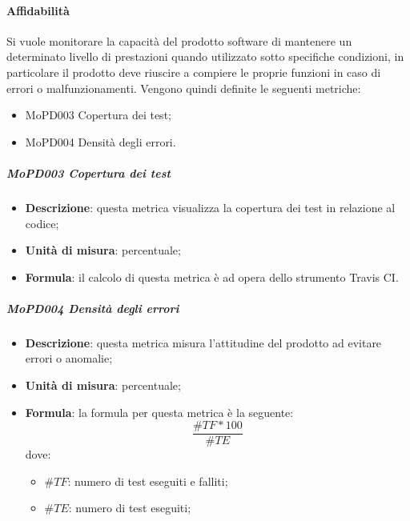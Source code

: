 \documentclass[../norme-di-progetto.tex]{subfiles}
\begin{document}
\paragraph{Affidabilità}
Si vuole monitorare la capacità del prodotto software di mantenere un determinato livello di prestazioni quando utilizzato sotto specifiche condizioni, in particolare il prodotto deve riuscire a compiere le proprie funzioni in caso di errori o malfunzionamenti. Vengono quindi definite le seguenti metriche:
\begin{itemize}
  \item MoPD003 Copertura dei test;
  \item MoPD004 Densità degli errori.
\end{itemize}
\subparagraph{MoPD003 Copertura dei test}
\begin{itemize}
  \item \textbf{Descrizione}: questa metrica visualizza la copertura dei test in relazione al codice;
  \item \textbf{Unità di misura}: percentuale;
  \item \textbf{Formula}: il calcolo di questa metrica è ad opera dello strumento Travis CI.
\end{itemize}

\subparagraph{MoPD004 Densità degli errori}
\begin{itemize}
  \item \textbf{Descrizione}: questa metrica misura l'attitudine del prodotto ad evitare errori o anomalie;
  \item \textbf{Unità di misura}: percentuale;
  \item \textbf{Formula}: la formula per questa metrica è la seguente:
  \begin{displaymath}
    \frac{\#TF * 100}{\#TE}
  \end{displaymath}
  dove:
  \begin{itemize}
    \item $ \#TF $: numero di test eseguiti e falliti;
    \item $ \#TE $: numero di test eseguiti;
  \end{itemize}
\end{itemize}
\end{document}
